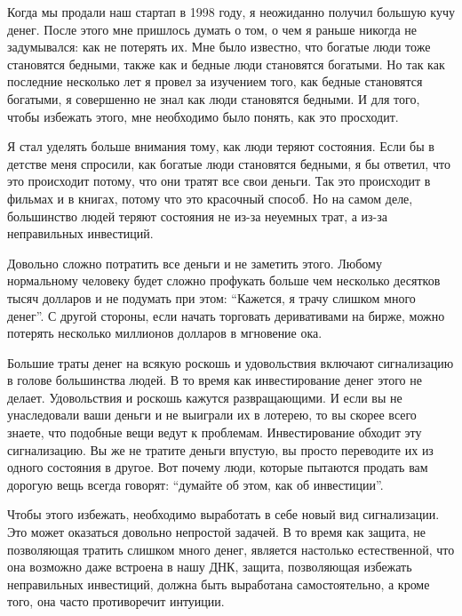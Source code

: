 \documentclass[ebook,12pt,oneside,openany]{memoir}
\date{}
\begin{document}
\maketitle

Когда мы продали наш стартап в 1998 году, я неожиданно получил большую
кучу денег. После этого мне пришлось думать о том, о чем я раньше
никогда не задумывался: как не потерять их. Мне было известно, что
богатые люди тоже становятся бедными, также как и бедные люди
становятся богатыми. Но так как последние несколько лет я провел за
изучением того, как бедные становятся богатыми, я совершенно не знал
как люди становятся бедными. И для того, чтобы избежать этого, мне
необходимо было понять, как это просходит.

Я стал уделять больше внимания тому, как люди теряют состояния. Если
бы в детстве меня спросили, как богатые люди становятся бедными, я бы
ответил, что это происходит потому, что они тратят все свои деньги.
Так это происходит в фильмах и в книгах, потому что это красочный
способ. Но на самом деле, большинство людей теряют состояния не из-за
неуемных трат, а из-за неправильных инвестиций.

Довольно сложно потратить все деньги и не заметить этого. Любому
нормальному человеку будет сложно профукать больше чем несколько
десятков тысяч долларов и не подумать при этом: “Кажется, я трачу
слишком много денег”. С другой стороны, если начать торговать
деривативами на бирже, можно потерять несколько миллионов долларов в
мгновение ока.

Большие траты денег на всякую роскошь и удовольствия включают
сигнализацию в голове большинства людей. В то время как инвестирование
денег этого не делает. Удовольствия и роскошь кажутся развращающими. И
если вы не унаследовали ваши деньги и не выиграли их в лотерею, то вы
скорее всего знаете, что подобные вещи ведут к проблемам.
Инвестирование обходит эту сигнализацию. Вы же не тратите деньги
впустую, вы просто переводите их из одного состояния в другое. Вот
почему люди, которые пытаются продать вам дорогую вещь всегда говорят:
“думайте об этом, как об инвестиции”.

Чтобы этого избежать, необходимо выработать в себе новый вид
сигнализации. Это может оказаться довольно непростой задачей. В то
время как защита, не позволяющая тратить слишком много денег, является
настолько естественной, что она возможно даже встроена в нашу ДНК,
защита, позволяющая избежать неправильных инвестиций, должна быть
выработана самостоятельно, а кроме того, она часто противоречит
интуиции.
\end{document}

